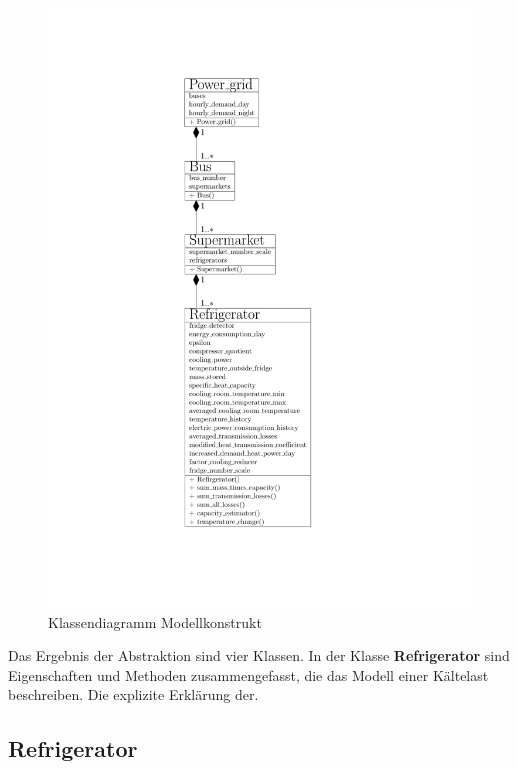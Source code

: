\begin{figure}[h!]
	\begin{center}
	\includegraphics[scale=0.7]{images/Theorie_Super/class_new_diagramm}
	\end{center}
\caption{Klassendiagramm Modellkonstrukt}
\label{fig:klassendiagramm}
\end{figure}

Das Ergebnis der Abstraktion sind vier Klassen. In der Klasse
\textbf{Refrigerator} sind Eigenschaften und Methoden zusammengefasst, die das
Modell einer K\"altelast beschreiben. Die explizite Erkl\"arung der.

\subsection*{Refrigerator}

